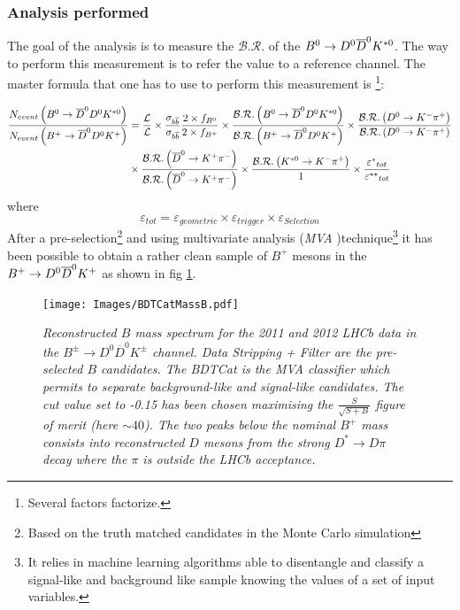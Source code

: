 \documentclass[paper=a4, fontsize=10pt]{scrartcl}
\numberwithin{equation}{section}		%
\numberwithin{figure}{section}			%
\numberwithin{table}{section}				%
\begin{document}
\subsubsection{Analysis performed}
The goal of the analysis is to measure the $\mathcal{B.R.}$ of the  $B^{0} \rightarrow D^0 \overline{D}^{0} K^{\ast 0}$. The way to perform this measurement is to refer the value to a reference channel. The master formula that one has to use to perform this measurement is \footnote{Several factors factorize.}:

\begin{equation}\label{1}
\begin{split} 
\frac { { N }_{ event }\left( B^0\rightarrow \overline{D}^0 D^0 K^{\ast 0} \right)  }{ { N }_{ event }\left( B^+\rightarrow \overline{D}^0 D^0 K^{+} \right)  }&  = \frac{\mathcal{L}}{\mathcal{L}}\times \frac{\sigma_{b\overline{b}}}{\sigma_{b\overline{b}}}   \frac { 2 \times { f }_{ { B }^{ 0 } } }{ 2 \times { f }_{ { B }^{ + } } } \times \frac { \mathcal{B.R.}\left( B^0\rightarrow \overline{D}^0 D^0 K^{\ast 0} \right)  }{ \mathcal{B.R.}\left(B^+\rightarrow \overline{D}^0 D^0 K^{+} \right)  } \times \frac { \mathcal{B.R.}\left( D^{0} \rightarrow K^{-} \pi^{+} \right)  }{ \mathcal{B.R.}\left( D^{0} \rightarrow K^{-} \pi^{+} \right)  }  \\   & \times \frac { \mathcal{B.R.}\left( \overline{D}^0 \rightarrow K^+ \pi^- \right)  }{ \mathcal{B.R.}\left( \overline{D}^0 \rightarrow K^+ \pi^- \right)  } \times \frac { \mathcal{B.R.}\left( K^{\ast 0} \rightarrow K^- \pi^+ \right)  }{ 1 } \times \frac { { \varepsilon ^{\ast} }_{ tot } }{ {  \varepsilon^{\ast \ast} }_{ tot } }
\end{split} 
\end{equation}
\normalsize where
\tiny \begin{equation} \label{epsilon}
 \varepsilon_{ tot } = \varepsilon_{geometric}\times \varepsilon_{trigger}\times \varepsilon_{Selection}
\end{equation}
\normalsize After a pre-selection\footnote{Based on the truth matched candidates in the Monte Carlo simulation} and using multivariate analysis (\textit{MVA} )technique\footnote{It relies in machine learning algorithms able to disentangle and classify a signal-like and background like sample knowing the values of a set of input variables.} it has been possible to obtain a rather clean sample of $B^{+}$ mesons in the $B^{+} \rightarrow D^0 \overline{D}^{0} K^{+}$ as shown in fig \ref{Bmass}.
\begin{figure}[h!]
\begin{center}
\texttt{[image: Images/BDTCatMassB.pdf]}
\caption{\textit{Reconstructed $B$ mass spectrum for  the 2011 and 2012 LHCb data in the $B^{\pm} \rightarrow D^{0} \overline{D}^{0} K^{\pm}$ channel. Data Stripping + Filter are the pre-selected $B$ candidates. The BDTCat is the MVA classifier which permits to separate background-like and signal-like candidates. The cut value set to -0.15 has been chosen maximising the $\frac{S}{\sqrt{S+B}}$ figure of merit (here $\sim 40$). The two peaks below the nominal $B^{+}$ mass  consists into reconstructed $D$ mesons from the strong $D^{\ast}\rightarrow D \pi$ decay where the $\pi$ is outside the LHCb acceptance.}}\label{Bmass}
\end{center}
\end{figure}
\end{document}
